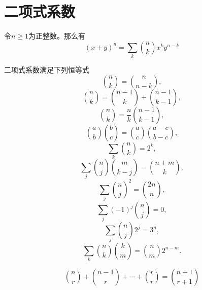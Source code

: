 \section{二项式系数}
\begin{theorem}
	令$n\geq 1$为正整数。那么有
	\begin{equation*}
		(x+y)^n = \sum\limits_k \binom{n}{k}x^ky^{n-k}
	\end{equation*}
\end{theorem}
\begin{proposition}\label{combinatorial identities}
	二项式系数满足下列恒等式
	\begin{equation*}
		\binom{n}{k} = \binom{n}{n-k},
	\end{equation*}
	\begin{equation*}
		\binom{n}{k} = \binom{n-1}{k} + \binom{n-1}{k-1},
	\end{equation*}
	\begin{equation*}
		\binom{n}{k} = \frac{n}{k}\binom{n-1}{k-1},
	\end{equation*}
	\begin{equation*}
		\binom{a}{b}\binom{b}{c} = \binom{a}{c}\binom{a-c}{b-c},
	\end{equation*}
	\begin{equation*}
		\sum_k \binom{n}{k} = 2^k,
	\end{equation*}
	\begin{equation*}
		\sum_j \binom{n}{j}\binom{m}{k-j} = \binom{n+m}{k},
	\end{equation*}
	\begin{equation*}
		\sum_j \binom{n}{j}^2 = \binom{2n}{n},
	\end{equation*}
	\begin{equation*}
		\sum_j (-1)^j\binom{n}{j} = 0,
	\end{equation*}
	\begin{equation*}
		\sum_j \binom{n}{j}2^j = 3^n,
	\end{equation*}
	\begin{equation*}
		\sum_k \binom{n}{k}\binom{k}{m} = \binom{n}{m} 2^{n-m}.
	\end{equation*}
\end{proposition}
\begin{proposition}
	\begin{equation*}
		\binom{n}{r} + \binom{n-1}{r}+\cdots + \binom{r}{r} = \binom{n+1}{r+1}
	\end{equation*}
\end{proposition}
